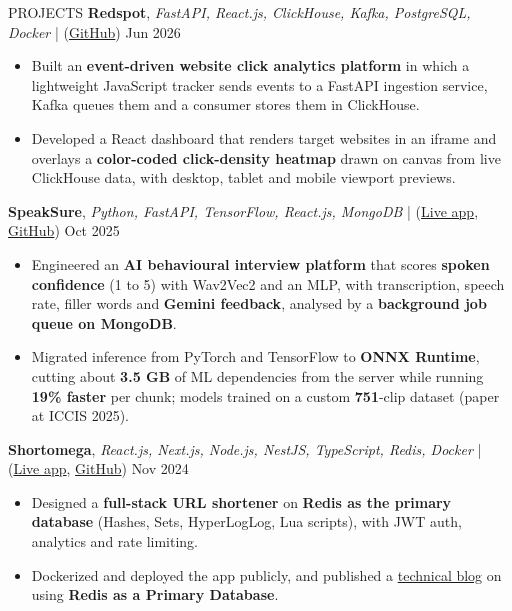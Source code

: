 \documentclass{resume} %
\begin{document}
\begin{rSection}{PROJECTS}
    \textbf{Redspot}, \textit{FastAPI, React.js, ClickHouse, Kafka, PostgreSQL, Docker} | (\href{https://github.com/ninadnaik10/redspot} {GitHub}) \hfill {Jun 2026}
    \begin{itemize}
    \setlength\itemsep{-0.6em}
    \item Built an \textbf{event-driven website click analytics platform} in which a lightweight JavaScript tracker sends events to a FastAPI ingestion service, Kafka queues them and a consumer stores them in ClickHouse.
    \item Developed a React dashboard that renders target websites in an iframe and overlays a \textbf{color-coded click-density heatmap} drawn on canvas from live ClickHouse data, with desktop, tablet and mobile viewport previews.
    \end{itemize}
     \textbf{SpeakSure}, \textit{Python, FastAPI, TensorFlow, React.js, MongoDB} | (\href{https://speaksure.ninadnaik.me/} {Live app}, \href{https://github.com/ninadnaik10/speaksure} {GitHub}) \hfill {Oct 2025}
    \begin{itemize}
        \setlength\itemsep{-0.6em}
        \item Engineered an \textbf{AI behavioural interview platform} that scores \textbf{spoken confidence} (1 to 5) with Wav2Vec2 and an MLP, with transcription, speech rate, filler words and \textbf{Gemini feedback}, analysed by a \textbf{background job queue on MongoDB}.
        \item Migrated inference from PyTorch and TensorFlow to \textbf{ONNX Runtime}, cutting about \textbf{3.5 GB} of ML dependencies from the server while running \textbf{19\% faster} per chunk; models trained on a custom \textbf{751}-clip dataset (paper at ICCIS 2025).
    \end{itemize}

  \textbf{Shortomega}, \textit{React.js, Next.js, Node.js, NestJS, TypeScript, Redis, Docker} | (\href{https://shortomega.ninadnaik.me/} {Live app}, \href{https://github.com/ninadnaik10/shortomega} {GitHub})  \hfill {Nov 2024}
    \begin{itemize}
        \setlength\itemsep{-0.6em}
        \item Designed a \textbf{full-stack URL shortener} on \textbf{Redis as the primary database} (Hashes, Sets, HyperLogLog, Lua scripts), with JWT auth, analytics and rate limiting.
        \item Dockerized and deployed the app publicly, and published a \href{https://tech.ninadnaik.me/using-redis-as-a-primary-database}{technical blog} on using \textbf{Redis as a Primary Database}.
    \end{itemize}

\end{rSection}
\end{document}

